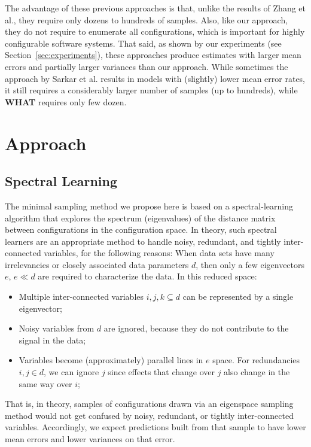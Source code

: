 \documentclass[smallextended]{svjour3}       %
\newcommand{\what}{{\bf WHAT}\xspace}
\begin{document}
The advantage of these previous approaches is that, unlike  the results of Zhang et al., they require only dozens to hundreds of samples. Also, like our approach, they do not require to enumerate all configurations, which is important for highly configurable software systems. 
That said, as shown by our experiments (see Section~\ref{sec:experiments}), these approaches produce estimates with  larger mean errors and partially larger variances than our approach. While sometimes the approach by Sarkar et al. results in  models with (slightly)
lower mean error rates, it still requires a considerably larger number of samples (up to hundreds), while \what requires only few dozen.
 
 \section{Approach}

\subsection{Spectral Learning}\label{sect:spect}

The minimal sampling method we propose here is based on a spectral-learning algorithm
that  explores the spectrum (eigenvalues) of the distance matrix between  configurations in the configuration space.
In theory, such spectral learners are an appropriate method to handle noisy, redundant, and tightly inter-connected variables, for the following reasons:
When data sets have many irrelevancies or closely associated data parameters $d$, then
only a few eigenvectors $e$, $e \ll d$  are required to characterize the data.
In this reduced space:
\begin{itemize}
\item
Multiple inter-connected variables $i,j,k \subseteq d$ can be represented
by a single eigenvector;
\item
Noisy variables from $d$ are
ignored, because they  do not contribute to the signal in the data;
\item
Variables  become (approximately) parallel lines
in $e$ space. For  redundancies \mbox{$i,j \in d$}, we
can ignore $j$
since effects that change over $j$ also
change in the same way over $i$;
\end{itemize}
That is, in theory, samples of configurations drawn via an eigenspace sampling method
would not get confused by noisy, redundant, or tightly inter-connected variables. Accordingly,
we expect predictions built from that sample to have  lower mean errors and lower variances on that error.
\end{document}
